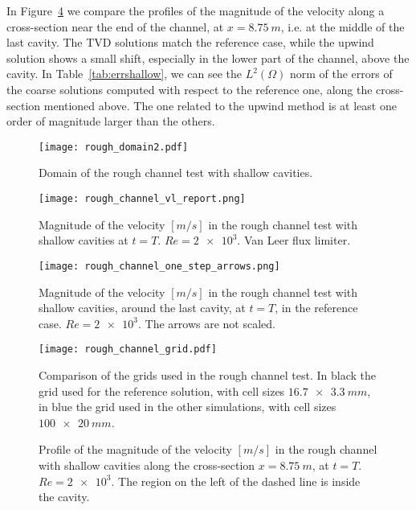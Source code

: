 In Figure~\ref{fig:linecompshallow} we compare the profiles of the magnitude 
of the velocity along a cross-section near the end of the channel, at 
$x=\SI{8.75}{m}$, i.e. at the middle of the last cavity.  The TVD solutions 
match the reference case, while the upwind solution shows a small shift, 
especially in the lower part of the channel, above the cavity. In 
Table~\ref{tab:errshallow}, we can see the 
$L^2(\Omega)$ norm 
of the errors of the coarse solutions computed with respect to the reference 
one, along the cross-section mentioned above. The one related to the 
upwind method is at least one order of magnitude larger than the others. 
\begin{figure}
	\centering
	\texttt{[image: rough\_domain2.pdf]}
	\caption[Domain of the rough channel test with shallow cavities]{Domain of 
	the rough channel test with shallow cavities.}
	\label{fig:roughdom}
\end{figure}
\begin{figure}
	\centering
	\texttt{[image: rough\_channel\_vl\_report.png]}
	\caption[Magnitude of the velocity in the rough channel test with 
	shallow cavities]{Magnitude of the velocity $[\si{m/s}]$ in the 
	rough channel test with shallow cavities at $t=T$. $Re=\num{2e3}$. 
	Van Leer flux limiter.}
	\label{fig:roughchannelvl}
\end{figure}
\begin{figure}
	\centering
	\texttt{[image: rough\_channel\_one\_step\_arrows.png]}
	\caption[Magnitude of the velocity in the rough channel test with schallo cavities around the last cavity]{Magnitude of the velocity $[\si{m/s}]$ in the rough channel test with shallow cavities, around the last cavity, at $t=T$, in the reference case. $Re=\num{2e3}$. The arrows are not scaled.}
\end{figure}
\begin{figure}
	\centering
	\texttt{[image: rough\_channel\_grid.pdf]}
	\caption[Grid comparison in the rough channel test]{Comparison of the grids used in the rough channel test. In black the grid used for the reference solution, with cell sizes $\SI{16.7x3.3}{mm}$, in blue the grid used in the other simulations, with cell sizes $\SI{100x20}{mm}$.}
	\label{fig:roughchannelgrid}
\end{figure}
\begin{figure}
	\centering
	
	\caption[Profile of the magnitude of the velocity in the rough channel with 
	shallow cavities at $Re=\num{2e3}$]{Profile of the magnitude of the 
	velocity $[\si{m/s}]$ in the rough channel with shallow cavities along the 
	cross-section $x=\SI{8.75}{m}$, at $t=T$. $Re=\num{2e3}$. The region on 
	the left of the dashed line is inside the cavity.}
	\label{fig:linecompshallow}
\end{figure}
